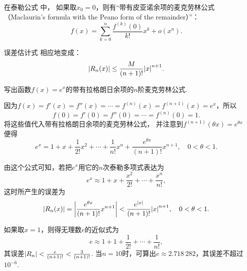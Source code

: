 在泰勒公式  中，
如果取\(x_0 = 0\)，则有“带有皮亚诺余项的麦克劳林公式
（Maclaurin's formula with the Peano form of the remainder）”：
\begin{equation}\label{equation:微分中值定理.泰勒公式4}
	f(x)=\sum_{k=0}^n \frac{f^{(k)}(0)}{k!} x^k + o(x^n).
\end{equation}

误差估计式  相应地变成：
\begin{equation}\label{equation:微分中值定理.泰勒公式.误差2}
	\abs{R_n(x)} \leq \frac{M}{(n+1)!} \abs{x}^{n+1}.
\end{equation}

\begin{example}
写出函数\(f(x) = e^x\)的带有拉格朗日余项的\(n\)阶麦克劳林公式.
\begin{solution}
因为\(f(x)=f'(x)=f''(x)=\dotsb=f^{(n)}(x)=f^{(n+1)}(x)=e^x\)，所以\begin{equation*}
	f(0)=f'(0)=f''(0)=\dotsb=f^{(n)}(0)=1.
\end{equation*}
将这些值代入带有拉格朗日余项的麦克劳林公式，
并注意到\(f^{(n+1)}(\theta x) = e^{\theta x}\)
便得\begin{equation*}%
	e^x = 1 + x + \frac{1}{2!} x^2 + \dotsb
	+ \frac{1}{n!} x^n + \frac{e^{\theta x}}{(n+1)!} x^{n+1},
	\quad 0 < \theta < 1.
\end{equation*}

由这个公式可知，若把\(e^x\)用它的\(n\)次泰勒多项式表达为\begin{equation*}
	e^x \approx 1 + x + \frac{x^2}{2!} + \dotsb + \frac{x^n}{n!},
\end{equation*}
这时所产生的误差为\begin{equation*}
	\abs{R_n(x)} = \abs{\frac{e^{\theta x}}{(n+1)!} x^{n+1}}
	< \frac{e^{\abs{x}}}{(n+1)!} \abs{x}^{n+1},
	\quad 0 < \theta < 1.
\end{equation*}

如果取\(x = 1\)，则得无理数\(e\)的近似式为\begin{equation*}
	e \approx 1 + 1 + \frac{1}{2!} + \dotsb + \frac{1}{n!},
\end{equation*}
其误差\(\abs{R_n} < \frac{e}{(n+1)!} < \frac{3}{(n+1)!}\).
当\(n=10\)时，可算出\(e \approx 2.718\ 282\)，其误差不超过\(10^{-6}\).
\end{solution}
\end{example}

